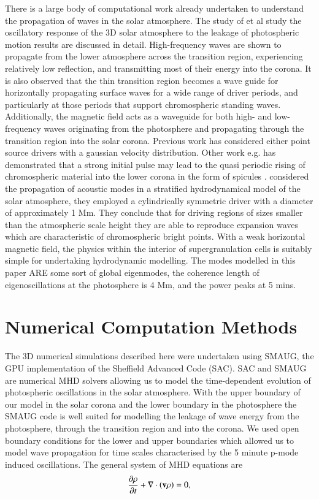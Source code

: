 \documentclass[authoryear,final,1p]{elsarticle}
\begin{document}
There is a large body of computational work already undertaken to understand the propagation of waves in the solar atmosphere. The study of  \citet{Fedun2009} et al study the oscillatory response of the 3D solar atmosphere to the leakage of photospheric motion results are discussed in detail. High-frequency waves are shown to propagate from the lower atmosphere across the transition region, experiencing relatively low reflection, and transmitting most of their energy into the corona. It is also observed that the thin transition region becomes a wave guide for horizontally propagating surface waves for a wide range of driver periods, and particularly at those periods that support chromospheric standing waves. Additionally, the magnetic field acts as a waveguide for both high- and low-frequency waves originating from the photosphere and propagating through the transition region into the solar corona. Previous work has considered either point source drivers with a gaussian velocity distribution. Other work e.g.  \citet{Murawski2010} has demonstrated that a strong initial pulse may lead to the quasi periodic rising of chromospheric material into the lower corona in the form of spicules \citet{Khomenko2012}. \citet{Kalkofen2010} considered the propagation of acoustic modes in a stratified hydrodynamical model of the solar atmosphere, they employed a cylindrically symmetric driver with a diameter of approximately 1 Mm. They conclude that for driving regions of sizes smaller than the atmospheric scale height they are able to reproduce expansion waves which are characteristic of chromospheric bright points. With a weak horizontal magnetic field, the physics within the interior of supergranulation cells \citet{Lites2008} is suitably simple for undertaking hydrodynamic modelling. The modes modelled in this paper ARE some sort of global eigenmodes, the coherence length of eigenoscillations at the photosphere is 4 Mm, and the power peaks at 5 mins. 

\section{Numerical Computation Methods}
The 3D numerical simulations described here were undertaken using SMAUG, the GPU implementation of the Sheffield Advanced Code (SAC)\citet{Griffiths2015}\citet{Shelyag2008}. SAC and SMAUG are numerical MHD solvers allowing us to model the time-dependent evolution of photospheric oscillations in the solar atmosphere.  With the upper boundary of our model in the solar corona and the lower boundary in the photosphere the SMAUG code is well suited for modelling the leakage of wave energy from the photosphere, through the transition region and into the corona. We used open boundary conditions for the lower and upper boundaries which allowed us to model wave propagation for time scales characterised by the 5 minute p-mode induced oscillations. The general system of MHD equations are
\begin{equation}\label{eqdens}
{{\partial \rho}\over{\partial t}}+\nabla\cdot\left( {\bf v}\rho\right)=0,
\end{equation}
\end{document}
